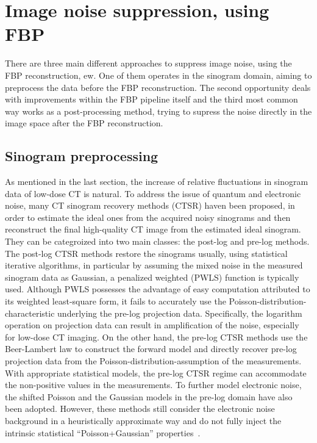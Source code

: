 \documentclass[12pt,a4paper]{article}
\begin{document}
\section{Image noise suppression, using FBP}

There are three main different approaches to suppress image noise, using the FBP reconstruction, ew. One of them operates in the sinogram domain, aiming to preprocess the data before the FBP reconstruction. The second opportunity deals with improvements within the FBP pipeline itself and the third most common way works as a post-processing method, trying to supress the noise directly in the image space after the FBP reconstruction. 

\subsection{Sinogram preprocessing}
As mentioned in the last section, the increase of relative fluctuations in sinogram data of low-dose CT is natural. To address the issue of quantum and electronic noise, many CT sinogram recovery methods (CTSR) haven been proposed, in order to estimate the ideal ones from the acquired noisy sinograms and then reconstruct the final high-quality CT image from the estimated ideal sinogram. They can be categroized into two main classes: the post-log and pre-log methods. The post-log CTSR methods restore the sinograms usually, using statistical iterative algorithms, in particular by assuming the mixed noise in the measured sinogram data as Gaussian, a penalized weighted (PWLS) function is typically used. Although PWLS possesses the advantage of easy computation attributed to its weighted least-square form, it fails to accurately use the Poisson-distribution-characteristic underlying the pre-log projection data. Specifically, the logarithm operation on projection data can result in amplification of the noise, especially for low-dose CT imaging. On the other hand, the pre-log CTSR methods use the Beer-Lambert law to construct the forward model and directly recover pre-log projection data from the Poisson-distribution-assumption of the measurements. With appropriate statistical models, the pre-log CTSR regime can accommodate the non-positive values in the measurements. To further model electronic noise, the shifted Poisson and the Gaussian models in the pre-log domain have also been adopted. However, these methods still consider the electronic noise background in a heuristically approximate way and do not fully inject the intrinsic statistical “Poisson+Gaussian” properties~\cite{Xie2017Robust}. 
\end{document}
